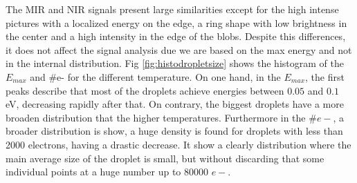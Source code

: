 The MIR and NIR signals present large similarities except for the high intense pictures with a localized energy on the edge, a ring shape with low brightness in the center and a high intensity in the edge of the blobs. Despite this differences, it does not affect the signal analysis due we are based on the max energy and not in the internal distribution. Fig \ref{fig:histodropletsize} shows the histogram of the $E_{max}$ and  $\#$e- for the different temperature. On one hand, in the $E_{max}$, the first peaks describe that most of the droplets achieve energies between $0.05$ and $0.1$ eV, decreasing rapidly after that. On contrary, the biggest droplets have a more broaden distribution that the higher temperatures. Furthermore in the $\#e-$, a broader distribution is show, a huge density is found for droplets with less than 2000 electrons, having a drastic decrease. It show a clearly distribution where the main average size of the droplet is small,  but without discarding that some individual points at a huge number up to 80000 $e-$.

